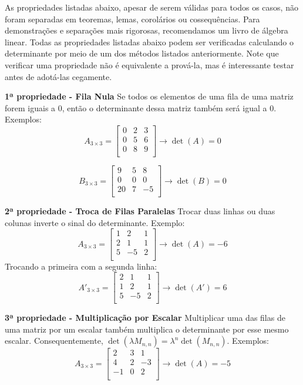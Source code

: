 \documentclass[
  letterpaper,
  DIV=11,
  numbers=noendperiod]{scrreprt}
\begin{document}
As propriedades listadas abaixo, apesar de serem válidas para todos os
casos, não foram separadas em teoremas, lemas, corolários ou
cossequências. Para demonstrações e separações mais rigorosas,
recomendamos um livro de álgebra linear. Todas as propriedades listadas
abaixo podem ser verificadas calculando o determinante por meio de um
dos métodos listados anteriormente. Note que verificar uma propriedade
não é equivalente a prová-la, mas é interessante testar antes de
adotá-las cegamente.

\textbf{1ª propriedade - Fila Nula} Se todos os elementos de uma fila de
uma matriz forem iguais a \(0\), então o determinante dessa matriz
também será igual a \(0\). Exemplos: \[
A_{3\times3} =
\begin{bmatrix}
    0 & 2 & 3\\
    0 & 5 & 6\\
    0 & 8 & 9 \\
\end{bmatrix}
\rightarrow \det(A) = 0
\]

\[
B_{3\times3} =
\begin{bmatrix}
    9 & 5 & 8\\
    0 & 0 & 0\\
    20 & 7 & -5 \\
\end{bmatrix}
\rightarrow \det(B) = 0
\]

\textbf{2ª propriedade - Troca de Filas Paralelas} Trocar duas linhas ou
duas colunas inverte o sinal do determinante. Exemplo: \[
A_{3\times3} =
\begin{bmatrix}
    1 & 2 & 1\\
    2 & 1 & 1\\
    5 & -5 & 2 \\
\end{bmatrix}
\rightarrow \det(A) = -6
\] Trocando a primeira com a segunda linha: \[
A'_{3\times3} =
\begin{bmatrix}
    2 & 1 & 1\\
    1 & 2 & 1\\
    5 & -5 & 2 \\
\end{bmatrix}
\rightarrow \det(A') = 6
\]

\textbf{3ª propriedade - Multiplicação por Escalar} Multiplicar uma das
filas de uma matriz por um escalar também multiplica o determinante por
esse mesmo escalar. Consequentemente,
\(\det(\lambda M_{n,n}) = \lambda ^ n \det(M_{n,n})\). Exemplos: \[
A_{3\times3} =
\begin{bmatrix}
    2 & 3 & 1  \\
    4 & 2 & -3 \\
    -1 & 0 & 2 \\
\end{bmatrix}
\rightarrow \det(A) = -5
\]
\end{document}
